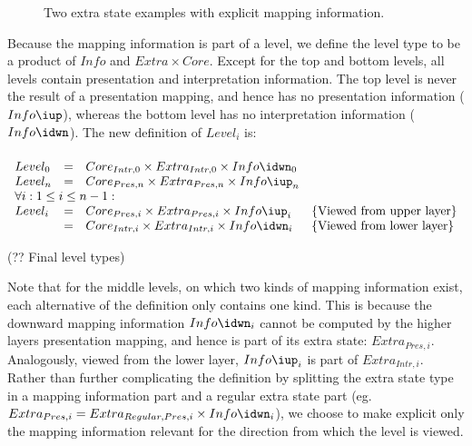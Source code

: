 \begin{figure}
\begin{center}
\begin{center}
\end{center}
\caption{Two extra state examples with explicit mapping information.}\label{coreExtraInfoExamples} 
\end{center}
\end{figure}

Because the mapping information is part of a level, we define the level type to be a product of $Info$ and 
$Extra \times Core$. Except for the top and bottom levels, all levels contain presentation and interpretation information. The top level is never the result of a presentation mapping, and hence has no presentation information ($Info\iup$), whereas the bottom level has no interpretation information ($Info\idwn$). The new definition of $Level_i$ is:

\begin{small}\begin{align*}%
\end{align*} 
\(\begin{array}{lcll}
Level_{0} & = & Core_{Intr,0} \times Extra_{Intr,0} \times Info\idwn_{0} \\
Level_{n} & = & Core_{Pres,n} \times Extra_{Pres,n} \times  Info\iup_{n}\\
\lefteqn{\forall i:1 \le i \le n-1:}  \\
Level_{i} & = & Core_{Pres,i} \times Extra_{Pres,i}  \times Info\iup_{i} & \text{\{Viewed from upper layer\}}\\  
               & = & Core_{Intr,i} \times Extra_{Intr,i} \times Info\idwn_{i} & \text{\{Viewed from lower layer\}}
\end{array}\)\end{small}
\begin{center}(?? Final level types)\end{center}\vspace{1em}

Note that for the middle levels, on which two kinds of mapping information exist, each alternative of the definition only contains one kind. This is because the downward mapping information $Info\idwn_{i}$ cannot be computed by the higher layers presentation mapping, and hence is part of its extra state: $Extra_{Pres,i}$. Analogously, viewed from the lower layer, $Info\iup_{i}$ is part of $Extra_{Intr,i}$. Rather than further complicating the definition by splitting the extra state type in a mapping information part and a regular extra state part (eg. $Extra_{Pres,i} = Extra_{Regular,Pres,i} \times Info\idwn_{i}$), we choose to make explicit only the mapping information relevant for the direction from which the level is viewed.

